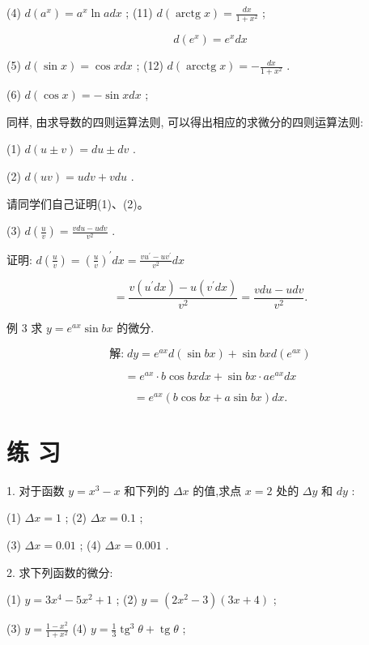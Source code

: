 \documentclass[10pt]{article}
\begin{document}
(4) \(d\left( {a}^{x}\right) = {a}^{x}\ln {adx}\) ; (11) \(d\left( {\operatorname{arctg}x}\right) = \frac{dx}{1 + {x}^{2}}\) ;

\[
d\left( {e}^{x}\right) = {e}^{x}{dx}
\]

(5) \(d\left( {\sin x}\right) = \cos {xdx}\) ; (12) \(d\left( {\operatorname{arcctg}x}\right) = - \frac{dx}{1 + {x}^{2}}\) .

(6) \(d\left( {\cos x}\right) = - \sin {xdx}\) ;

同样, 由求导数的四则运算法则, 可以得出相应的求微分的四则运算法则:

(1) \(d\left( {u \pm v}\right) = {du} \pm {dv}\) .

(2) \(d\left( {uv}\right) = {udv} + {vdu}\) .

请同学们自己证明(1)、(2)。

(3) \(d\left( \frac{u}{v}\right) = \frac{{vdu} - {udv}}{{v}^{2}}\) .

证明: \(d\left( \frac{u}{v}\right) = {\left( \frac{u}{v}\right) }^{\prime }{dx} = \frac{v{u}^{\prime } - u{v}^{\prime }}{{v}^{2}}{dx}\)

\[
= \frac{v\left( {{u}^{\prime }{dx}}\right) - u\left( {{v}^{\prime }{dx}}\right) }{{v}^{2}} = \frac{{vdu} - {udv}}{{v}^{2}}.
\]

例 3 求 \(y = {e}^{ax}\sin {bx}\) 的微分.

\[
\text{解:}\;{dy} = {e}^{ax}d\left( {\sin {bx}}\right) + \sin {bxd}\left( {e}^{ax}\right)
\]

\[
= {e}^{ax} \cdot b\cos {bxdx} + \sin {bx} \cdot a{e}^{ax}{dx}
\]

\[
= {e}^{ax}\left( {b\cos {bx} + a\sin {bx}}\right) {dx}\text{.}
\]

\section*{练 习}

1. 对于函数 \(y = {x}^{3} - x\) 和下列的 \({\Delta x}\) 的值,求点 \(x = 2\) 处的 \({\Delta y}\) 和 \({dy}\) :

(1) \({\Delta x} = 1\) ; (2) \({\Delta x} = {0.1}\) ;

(3) \({\Delta x} = {0.01}\) ; (4) \({\Delta x} = {0.001}\) .

2. 求下列函数的微分:

(1) \(y = 3{x}^{4} - 5{x}^{2} + 1\) ; (2) \(y = \left( {2{x}^{2} - 3}\right) \left( {{3x} + 4}\right)\) ;

(3) \(y = \frac{1 - {x}^{2}}{1 + {x}^{2}}\) (4) \(y = \frac{1}{3}{\operatorname{tg}}^{3}\theta + \operatorname{tg}\theta\) ;
\end{document}
